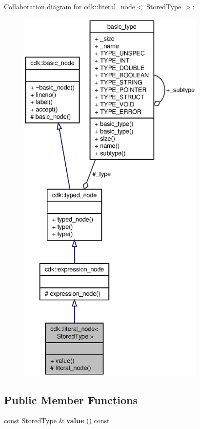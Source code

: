 Collaboration diagram for cdk\+:\+:literal\+\_\+node$<$ Stored\+Type $>$\+:
\nopagebreak
\begin{figure}[H]
\begin{center}
\leavevmode
\includegraphics[height=550pt]{classcdk_1_1literal__node__coll__graph}
\end{center}
\end{figure}
\subsection*{Public Member Functions}
\begin{DoxyCompactItemize}
\item 
\mbox{\label{classcdk_1_1literal__node_a2285a40a719019c68a379950ddc9ffc9}} 
const Stored\+Type \& {\bfseries value} () const
\end{DoxyCompactItemize}
